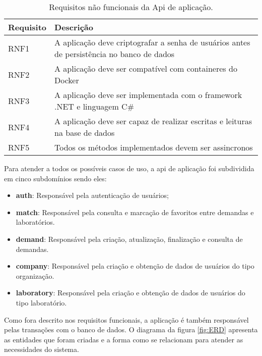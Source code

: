 \begin{table}[htb]
  \caption{Requisitos não funcionais da Api de aplicação.}
  \label{tab:requisitos_nao_funcionais_api}
  \begin{tabularx}{\textwidth}{l|l}
    \hline
    \textbf{Requisito} & \textbf{Descrição}                                                                        \\ \hline
    RNF1               & A aplicação deve criptografar a senha de usuários antes de persistência no banco de dados \\
    RNF2               & A aplicação deve ser compatível com containeres do Docker                                 \\
    RNF3               & A aplicação deve ser implementada com o framework .NET e linguagem C{\#}                  \\
    RNF4               & A aplicação deve ser capaz de realizar escritas e leituras na base de dados               \\
    RNF5               & Todos os métodos implementados devem ser assincronos                                      \\ \hline
  \end{tabularx}
  \fonte{}
\end{table}

Para atender a todos os possíveis casos de uso, a \gls{api} de aplicação foi subdividida em cinco subdomínios sendo eles:

\begin{itemize}
  \item \textbf{auth}: Responsável pela autenticação de usuários;
  \item \textbf{match}: Responsável pela consulta e marcação de favoritos entre demandas e laboratórios.
  \item \textbf{demand}: Responsável pela criação, atualização, finalização e consulta de demandas.
  \item \textbf{company}: Responsável pela criação e obtenção de dados de usuários do tipo organização.
  \item \textbf{laboratory}: Responsável pela criação e obtenção de dados de usuários do tipo laboratório.
\end{itemize}

Como fora descrito nos requisitos funcionais, a aplicação é também responsável pelas transações com o banco de dados. O diagrama da figura \ref{fig:ERD} apresenta as entidades que foram criadas e a forma como se relacionam para atender as necessidades do sistema.

